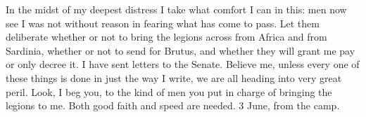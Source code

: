 

 In the midst of my deepest distress I take what comfort I can in this: men now see I was not without reason in fearing what has come to pass. Let them deliberate whether or not to bring the legions across from Africa and from Sardinia, whether or not to send for Brutus, and whether they will grant me pay or only decree it. I have sent letters to the Senate. Believe me, unless every one of these things is done in just the way I write, we are all heading into very great peril. Look, I beg you, to the kind of men you put in charge of bringing the legions to me. Both good faith and speed are needed. 3 June, from the camp.
